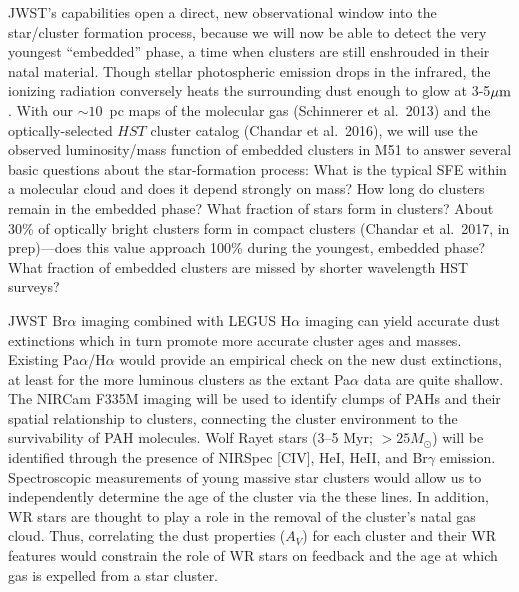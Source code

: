 \documentclass[12pt]{article}
\begin{document}
JWST's capabilities open a direct, new observational window into the star/cluster formation process, because we will now be able to detect the very youngest ``embedded'' phase, a time when clusters are still enshrouded in their natal material.  Though stellar photospheric emission drops in the infrared, the ionizing radiation conversely heats the surrounding dust enough to glow at 3-5$\hbox{$\mu$m}$.  With our $\sim10$~pc maps of the molecular gas (Schinnerer et al.\ 2013) and the optically-selected $HST$ cluster catalog (Chandar et al.\ 2016), we will use the observed luminosity/mass function of embedded clusters in M51 to answer several basic questions about the star-formation process:  What is the typical SFE within a molecular cloud and does it depend strongly on mass?  How long do clusters remain in the embedded phase?  What fraction of stars form in clusters?  About 30\% of optically bright clusters form in compact clusters (Chandar et al.\ 2017, in prep)---does this value approach 100\% during the youngest, embedded phase?  What fraction of embedded clusters are missed by shorter wavelength HST surveys?

JWST Br$\alpha$ imaging combined with LEGUS H$\alpha$ imaging can yield accurate dust extinctions which in turn promote more accurate cluster ages and masses.  Existing Pa$\alpha$/Η$\alpha$ would provide an empirical check on the new dust extinctions, at least for the more luminous clusters as the extant Pa$\alpha$ data are quite shallow.  The NIRCam F335M imaging will be used to identify clumps of PAHs and their spatial relationship to clusters, connecting the cluster environment to the survivability of PAH molecules.  Wolf Rayet stars (3--5 Myr; $>25 M_\odot$) will be identified through the presence of NIRSpec [CIV], HeI, HeII, and Br$\gamma$ emission.  Spectroscopic measurements of young massive star clusters would allow us to independently determine the age of the cluster via the these lines. In addition, WR stars are thought to play a role in the removal of the cluster's natal gas cloud. Thus, correlating the dust properties ($A_V$) for each cluster and their WR features would constrain the role of WR stars on feedback and the age at which gas is expelled from a star cluster. 





\vspace{0.1in}
\end{document}
